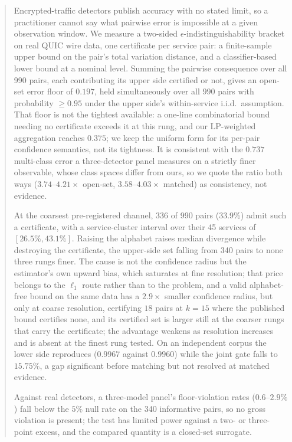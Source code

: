 \begin{abstract}
Encrypted-traffic detectors publish accuracy with no stated limit, so a
practitioner cannot say what pairwise error is impossible at a given observation
window. We measure a two-sided $\epsilon$-indistinguishability bracket on real
QUIC wire data, one certificate per service pair: a finite-sample upper bound on
the pair's total variation distance, and a classifier-based lower bound at a
nominal level. Summing the pairwise consequence over all 990 pairs, each
contributing its upper side certified or not, gives an open-set error floor of
$0.197$, held simultaneously over all $990$ pairs with probability $\ge 0.95$
under the upper side's within-service i.i.d.\ assumption.
That floor is not the tightest available: a one-line combinatorial bound needing
no certificate exceeds it at this rung, and our LP-weighted aggregation reaches
$0.375$; we keep the uniform form for its per-pair confidence semantics, not its
tightness. It is consistent with the $0.737$ multi-class error a three-detector
panel measures on a strictly finer observable, whose class spaces differ from
ours, so we quote the ratio both ways ($3.74$--$4.21\times$ open-set,
$3.58$--$4.03\times$ matched) as consistency, not evidence.

At the coarsest pre-registered channel, 336 of 990 pairs (33.9\%) admit such a
certificate, with a service-cluster interval over their 45 services of
$[26.5\%, 43.1\%]$. Raising the alphabet raises median divergence while
destroying the certificate, the upper-side set falling from 340 pairs to none
three rungs finer. The cause is not the confidence radius but the estimator's
own upward bias, which saturates at fine resolution; that price belongs to the
$\ell_1$ route rather than to the problem, and a valid alphabet-free bound on the
same data has a $2.9\times$ smaller confidence radius, but only at coarse
resolution, certifying $18$
pairs at $k{=}15$ where the published bound certifies none, and its certified set
is larger still at the coarser rungs that carry the certificate; the advantage
weakens as
resolution increases and is absent at the finest rung tested. On an independent corpus the lower side reproduces ($0.9967$ against
$0.9960$) while the joint gate falls to $15.75\%$, a gap significant before
matching but not resolved at matched evidence.

Against real detectors, a three-model panel's floor-violation rates
($0.6$--$2.9\%$) fall below the $5\%$ null rate on the 340 informative pairs, so
no gross violation is present; the test has limited power against a two- or three-point
excess, and the compared quantity is a closed-set surrogate.
\end{abstract}
